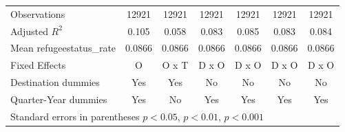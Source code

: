 \begin{table}[!ht]
\begin{tabular}{l*{6}{c}}
\hline
Observations        &       12921         &       12921         &       12921         &       12921         &       12921         &       12921         \\
Adjusted \(R^{2}\)  &       0.105         &       0.058         &       0.083         &       0.085         &       0.083         &       0.084         \\
Mean refugeestatus\_rate&      0.0866         &      0.0866         &      0.0866         &      0.0866         &      0.0866         &      0.0866         \\
Fixed Effects       &           O         &       O x T         &       D x O         &       D x O         &       D x O         &       D x O         \\
Destination dummies &         Yes         &         Yes         &          No         &          No         &          No         &          No         \\
Quarter-Year dummies&         Yes         &          No         &         Yes         &         Yes         &         Yes         &         Yes         \\
\hline\hline
\multicolumn{7}{l}{ Standard errors in parentheses \sym{*} \(p<0.05\), \sym{**} \(p<0.01\), \sym{***} \(p<0.001\)}\\
\end{tabular}
\end{table}
